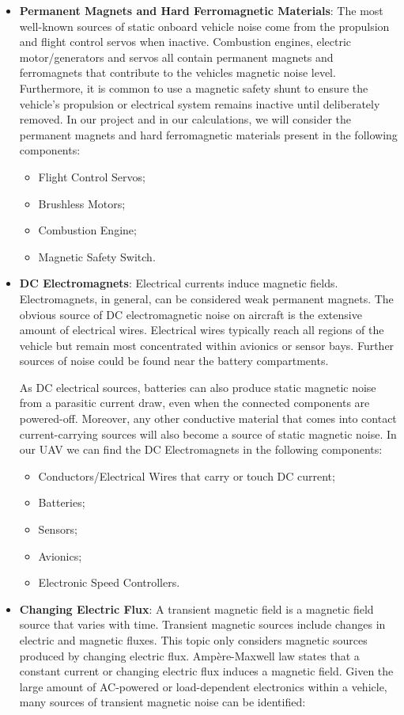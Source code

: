 \documentclass[english,fira]{ist-report}
\begin{document}
\begin{itemize}
    \item \textbf{Permanent Magnets and Hard Ferromagnetic Materials}: The most well-known sources of static onboard vehicle noise come from the propulsion and flight control servos when inactive. Combustion engines, electric motor/generators and servos all contain permanent magnets and ferromagnets that contribute to the vehicles magnetic noise level. Furthermore, it is common to use a magnetic safety shunt to ensure the vehicle’s propulsion or electrical system remains inactive until deliberately removed. In our project and in our calculations, we will consider the permanent magnets and hard ferromagnetic materials present in the following components:
    \begin{itemize}
        \item Flight Control Servos;
        \item Brushless Motors;
        \item Combustion Engine;
        \item Magnetic Safety Switch.
    \end{itemize}
    \item \textbf{DC Electromagnets}: Electrical currents induce magnetic fields. Electromagnets, in general, can be considered weak permanent magnets. The obvious source of DC electromagnetic noise on aircraft is the extensive amount of electrical wires. Electrical wires typically reach all regions of the vehicle but remain most concentrated within avionics or sensor bays. Further sources of noise could be found near the battery compartments. \par As DC electrical sources, batteries can also produce static magnetic noise from a parasitic current draw, even when the connected components are powered-off. Moreover, any other conductive material that comes into contact current-carrying sources will also become a source of static magnetic noise. In our UAV we can find the DC Electromagnets in the following components:
    \begin{itemize}
        \item Conductors/Electrical Wires that carry or touch DC current;
        \item Batteries;
        \item Sensors;
        \item Avionics;
        \item Electronic Speed Controllers. 
    \end{itemize}
    \item \textbf{Changing Electric Flux}: A transient magnetic field is a magnetic field source that varies with time. Transient magnetic sources include changes in electric and magnetic fluxes. This topic only considers magnetic sources produced by changing electric flux. Ampère-Maxwell law states that a constant current or changing electric flux induces a magnetic field. Given the large amount of AC-powered or load-dependent electronics within a vehicle, many sources of transient magnetic noise can be identified:

\end{itemize}
\end{document}
